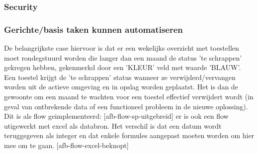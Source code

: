 \subsubsection{Security}


\subsubsection{Gerichte/basis taken kunnen automatiseren}

De belangrijkste case hiervoor is dat er een wekelijks overzicht met toestellen moet rondegstuurd worden die langer dan een maand de status 'te schrappen' gekregen hebben, gekenmerkd door een 'KLEUR' veld met waarde 'BLAUW'. Een toestel krijgt de 'te schrappen' status wanneer ze verwijderd/vervangen worden uit de actieve omgeving en in opslag worden geplaatst. Het is dan de gewoonte om een maand te wachten voor een toestel effectief verwijdert wordt (in geval van ontbrekende data of een functioneel probleem in de nieuwe oplossing).\\
Dit is als flow geimplementeerd:
[afb-flow-sp-uitgebreid]
er is ook een flow utigewerkt met excel als databron. Het verschil is dat een datum wordt teruggegeven als integer en dat enkele formules aangepast moeten worden om hier mee om te gaan. 
[afb-flow-excel-beknopt]

